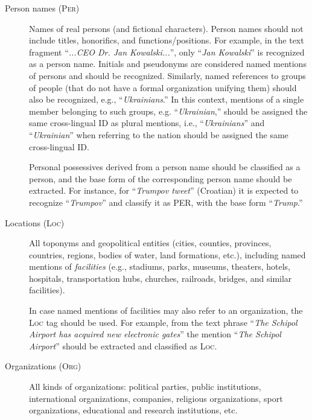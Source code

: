 \documentclass[11pt]{article}
\begin{document}
\begin{description}

\item[Person names (\textsc{Per})] 
  
  {Names of real persons (and fictional characters).} Person
  names should not include titles, honorifics, and functions/positions. For example, in the
  text fragment ``\textit{...CEO Dr. Jan Kowalski...}'', only ``\textit{Jan Kowalski}'' is
  recognized as a person name.  Initials and pseudonyms are considered named mentions of
  persons and should be recognized.  Similarly, named references to groups of people (that do
  not have a formal organization unifying them) should also be recognized, e.g.,
  ``\textit{Ukrainians}.'' In this context, mentions of a single member belonging to such
  groups, e.g.  ``\textit{Ukrainian},'' should be assigned the same cross-lingual ID as plural
  mentions, i.e., ``\textit{Ukrainians}'' and ``\textit{Ukrainian}'' when referring to the
  nation should be assigned the same cross-lingual ID.

  Personal possessives derived from a person name should be classified as a person, and the
  base form of the corresponding person name should be extracted. For instance, for
  ``\textit{Trumpov tweet}'' (Croatian) it is expected to recognize ``\textit{Trumpov}'' and
  classify it as PER, with the base form ``\textit{Trump}.''


\item[Locations (\textsc{Loc})]

  All toponyms and geopolitical entities (cities, counties, provinces, countries, regions,
  bodies of water, land formations, etc.), including named mentions of {\em facilities} (e.g.,
  stadiums, parks, museums, theaters, hotels, hospitals, transportation hubs, churches,
  railroads, bridges, and similar facilities).

  In case named mentions of facilities may also refer to an organization, the \textsc{Loc} tag
  should be used.  For example, from the text phrase ``\textit{The Schipol Airport has
    acquired new electronic gates}'' the mention ``\textit{The Schipol Airport}'' should be
  extracted and classified as \textsc{Loc}.

\item[Organizations (\textsc{Org})]

  All kinds of organizations: political parties, public institutions, international
  organizations, companies, religious organizations, sport organizations, educational and
  research institutions, etc.


\end{description}
\end{document}
